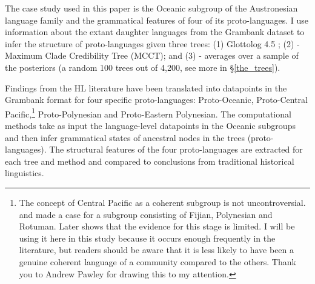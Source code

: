 \documentclass[12pt,letterpaper]{article}
\begin{document}


The case study used in this paper is the Oceanic subgroup of the Austronesian language family and the grammatical features of four of its proto-languages. I use information about the extant daughter languages from the Grambank dataset \citep{grambank_release} to infer the structure of proto-languages given three trees: (1) Glottolog 4.5 \citep{glottolog4_5}; (2) \citet{grayetal_2009} - Maximum Clade Credibility Tree (MCCT); and (3) \citet{grayetal_2009} - averages over a sample of the posteriors (a random 100 trees out of 4,200, see more in §\ref{the_trees}). 

Findings from the HL literature have been translated into datapoints in the Grambank format for four specific proto-languages: Proto-Oceanic, Proto-Central Pacific,\footnote{The concept of Central Pacific as a coherent subgroup is not uncontroversial. \citet{grace1958position} and \citet{pawley1972internal} made a case for a subgroup consisting of Fijian, Polynesian and Rotuman. Later \citet{geraghty1996} shows that the evidence for this stage is limited. I will be using it here in this study because it occurs enough frequently in the literature, but readers should be aware that it is less likely to have been a genuine coherent language of a community compared to the others. Thank you to Andrew Pawley for drawing this to my attention.} Proto-Polynesian and Proto-Eastern Polynesian. The computational methods take as input the language-level datapoints in the Oceanic subgroups and then infer grammatical states of ancestral nodes in the trees (proto-languages). The structural features of the four proto-languages are extracted for each tree and method and compared to conclusions from traditional historical linguistics. 
\end{document}
